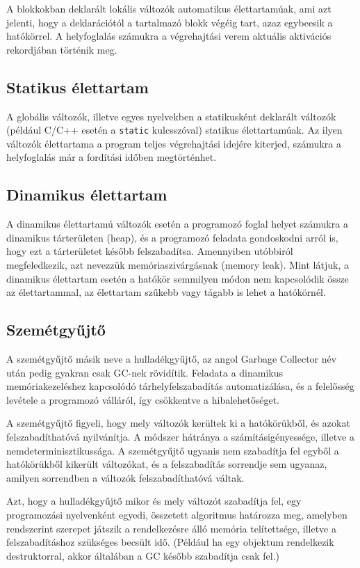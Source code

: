 \documentclass[margin=0px]{article}
\begin{document}
	A blokkokban deklarált lokális változók automatikus élettartamúak, ami azt jelenti, hogy a deklarációtól a tartalmazó blokk végéig tart, azaz egybeesik a hatókörrel. A helyfoglalás számukra a végrehajtási verem aktuális aktivációs rekordjában történik meg.
	
	\subsection{Statikus élettartam}
	
	A globális változók, illetve egyes nyelvekben a statikusként deklarált változók (például C/C++ esetén a \texttt{static} kulcsszóval) statikus élettartamúak. Az ilyen változók élettartama a program teljes végrehajtási idejére kiterjed, számukra a helyfoglalás már a fordítási időben megtörténhet.
	
	\subsection{Dinamikus élettartam}
	
	A dinamikus élettartamú változók esetén a programozó foglal helyet számukra a dinamikus tárterületen (heap), és a programozó feladata gondoskodni arról is, hogy ezt a tárterületet később felszabadítsa. Amennyiben utóbbiról megfeledkezik, azt nevezzük memóriaszivárgásnak (memory leak).
	Mint látjuk, a dinamikus élettartam esetén a hatókör semmilyen módon nem kapcsolódik össze az élettartammal, az élettartam szűkebb vagy tágabb is lehet a hatókörnél.
	
	\subsection{Szemétgyűjtő}
	
	A szemétgyűjtő másik neve a hulladékgyűjtő, az angol Garbage Collector név után pedig gyakran csak GC-nek rövidítik. Feladata a dinamikus memóriakezeléshez kapcsolódó tárhelyfelszabadítás automatizálása, és a felelősség levétele a programozó válláról, így csökkentve a hibalehetőséget.
	
	A szemétgyűjtő figyeli, hogy mely változók kerültek ki a hatókörükből, és azokat felszabadíthatóvá nyilvánítja. A módszer hátránya a számításigényessége, illetve a nemdeterminisztikussága. A szemétgyűjtő ugyanis nem szabadítja fel egyből a hatókörükből kikerült változókat, és a felszabadítás sorrendje sem ugyanaz, amilyen sorrendben a változók felszabadíthatóvá váltak.
	
	Azt, hogy a hulladékgyűjtő mikor és mely változót szabadítja fel, egy programozási nyelvenként egyedi, összetett algoritmus határozza meg, amelyben rendszerint szerepet játszik a rendelkezésre álló memória telítettsége, illetve a felszabadításhoz szükséges becsült idő. (Például ha egy objektum rendelkezik destruktorral, akkor általában a GC később szabadítja csak fel.)
	
\end{document}
